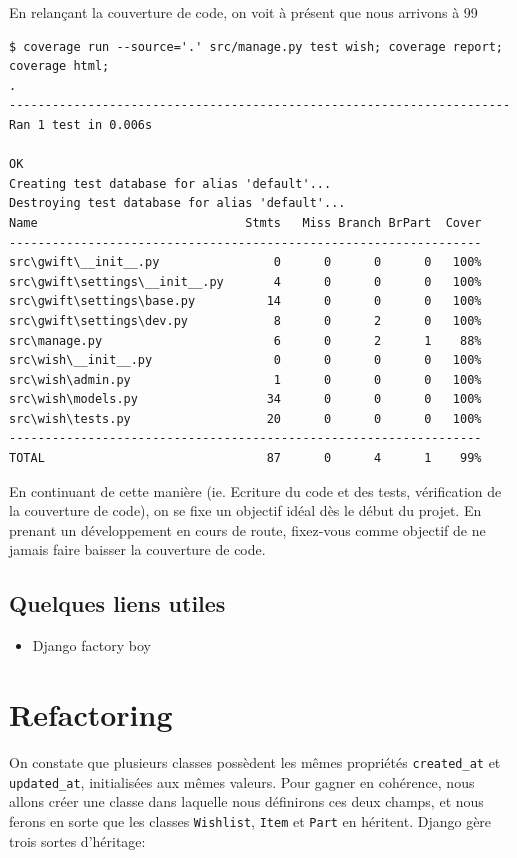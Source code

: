 \documentclass[11pt]{amsbook}
\begin{document}
En relançant la couverture de code, on voit à présent que nous arrivons à 99%


\begin{verbatim}
$ coverage run --source='.' src/manage.py test wish; coverage report; coverage html;
.
----------------------------------------------------------------------
Ran 1 test in 0.006s

OK
Creating test database for alias 'default'...
Destroying test database for alias 'default'...
Name                             Stmts   Miss Branch BrPart  Cover
------------------------------------------------------------------
src\gwift\__init__.py                0      0      0      0   100%
src\gwift\settings\__init__.py       4      0      0      0   100%
src\gwift\settings\base.py          14      0      0      0   100%
src\gwift\settings\dev.py            8      0      2      0   100%
src\manage.py                        6      0      2      1    88%
src\wish\__init__.py                 0      0      0      0   100%
src\wish\admin.py                    1      0      0      0   100%
src\wish\models.py                  34      0      0      0   100%
src\wish\tests.py                   20      0      0      0   100%
------------------------------------------------------------------
TOTAL                               87      0      4      1    99%
\end{verbatim}

En continuant de cette manière (ie. Ecriture du code et des tests, vérification de la couverture de code), on se fixe un objectif idéal dès le début du projet. En prenant un développement en cours de route, fixez-vous comme objectif de ne jamais faire baisser la couverture de code.


\hypertarget{x-quelques-liens-utiles}{\section{Quelques liens utiles}}
\begin{itemize}

\item Django factory boy 

\end{itemize}


\hypertarget{x-refactoring}{\chapter{Refactoring}}
On constate que plusieurs classes possèdent les mêmes propriétés \texttt{created\_at} et \texttt{updated\_at}, initialisées aux mêmes valeurs. Pour gagner en cohérence, nous allons créer une classe dans laquelle nous définirons ces deux champs, et nous ferons en sorte que les classes \texttt{Wishlist}, \texttt{Item} et \texttt{Part} en héritent. Django gère trois sortes d’héritage:
\end{document}
